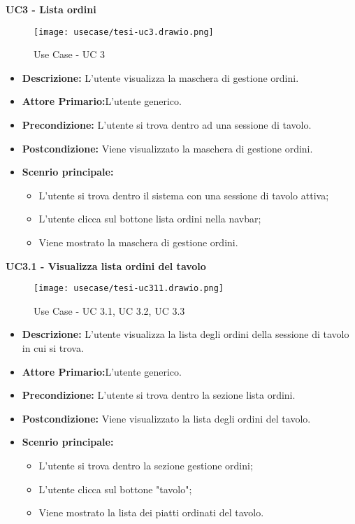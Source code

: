 \textbf{UC3 - Lista ordini}
\begin{figure}[H]
    \centering
    \texttt{[image: usecase/tesi-uc3.drawio.png]}
    \caption{Use Case - UC 3}
\end{figure}
\begin{itemize}
    \item \textbf{Descrizione:} L'utente visualizza la maschera di gestione ordini.
    \item \textbf{Attore Primario:}L'utente generico.
    \item \textbf{Precondizione:} L'utente si trova dentro ad una sessione di tavolo.
    \item \textbf{Postcondizione:} Viene visualizzato la maschera di gestione ordini.
    \item \textbf{Scenrio principale:}
    \begin{itemize}
        \item L'utente si trova dentro il sistema con una sessione di tavolo attiva;
        \item L'utente clicca sul bottone lista ordini nella navbar;
        \item Viene mostrato la maschera di gestione ordini.
    \end{itemize}
\end{itemize}
\textbf{UC3.1 - Visualizza lista ordini del tavolo}
\begin{figure}[H]
    \centering
    \texttt{[image: usecase/tesi-uc311.drawio.png]}
    \caption{Use Case - UC 3.1, UC 3.2, UC 3.3}
\end{figure}
\begin{itemize}
    \item \textbf{Descrizione:} L'utente visualizza la lista degli ordini della sessione di tavolo in cui si trova. 
    \item \textbf{Attore Primario:}L'utente generico.
    \item \textbf{Precondizione:} L'utente si trova dentro la sezione lista ordini.
    \item \textbf{Postcondizione:} Viene visualizzato la lista degli ordini del tavolo.
    \item \textbf{Scenrio principale:}
    \begin{itemize}
        \item L'utente si trova dentro la sezione gestione ordini;
        \item L'utente clicca sul bottone "tavolo";
        \item Viene mostrato la lista dei piatti ordinati del tavolo.
    \end{itemize}
\end{itemize}
